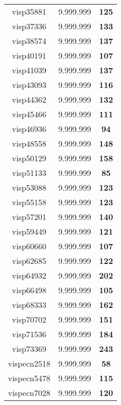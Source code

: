 \begin{tabular}{cc||c}
visp35881        & 9.999.999        & {\bf 125}       \\ 
visp37336        & 9.999.999        & {\bf 133}       \\ 
visp38574        & 9.999.999        & {\bf 137}       \\ 
visp40191        & 9.999.999        & {\bf 107}       \\ 
visp41039        & 9.999.999        & {\bf 137}       \\ 
visp43093        & 9.999.999        & {\bf 116}       \\ 
visp44362        & 9.999.999        & {\bf 132}       \\ 
visp45466        & 9.999.999        & {\bf 111}       \\ 
visp46936        & 9.999.999        & {\bf 94}        \\ 
visp48558        & 9.999.999        & {\bf 148}       \\ 
visp50129        & 9.999.999        & {\bf 158}       \\ 
visp51133        & 9.999.999        & {\bf 85}        \\ 
visp53088        & 9.999.999        & {\bf 123}       \\ 
visp55158        & 9.999.999        & {\bf 123}       \\ 
visp57201        & 9.999.999        & {\bf 140}       \\ 
visp59449        & 9.999.999        & {\bf 121}       \\ 
visp60660        & 9.999.999        & {\bf 107}       \\ 
visp62685        & 9.999.999        & {\bf 122}       \\ 
visp64932        & 9.999.999        & {\bf 202}       \\ 
visp66498        & 9.999.999        & {\bf 105}       \\ 
visp68333        & 9.999.999        & {\bf 162}       \\ 
visp70702        & 9.999.999        & {\bf 151}       \\ 
visp71536        & 9.999.999        & {\bf 184}       \\ 
visp73369        & 9.999.999        & {\bf 243}       \\ 
vispecn2518      & 9.999.999        & {\bf 58}        \\ 
vispecn5478      & 9.999.999        & {\bf 115}       \\ 
vispecn7028      & 9.999.999        & {\bf 120}       \\ 

\end{tabular}
